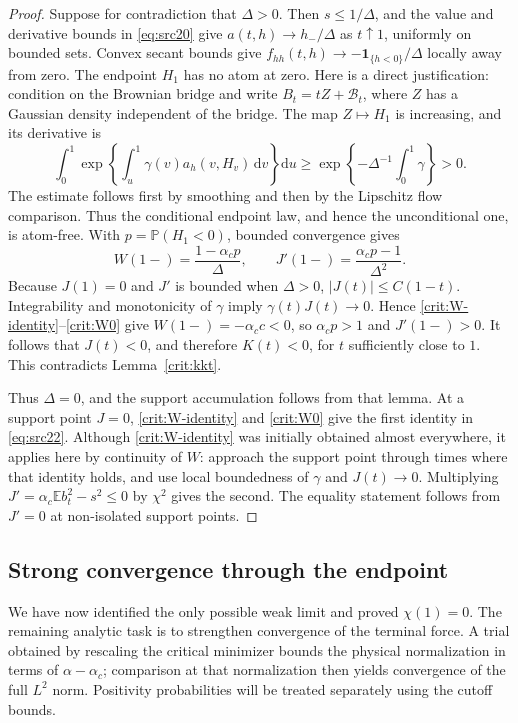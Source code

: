 \documentclass[11pt,a4paper]{article}
\numberwithin{equation}{section}
\theoremstyle{definition}
\theoremstyle{remark}
\newcommand{\E}{\mathbb E}
\newcommand{\Prob}{\mathbb P}
\newcommand{\dd}{\mathrm d}
\newcommand{\ind}{\mathbf 1}
\begin{document}
\begin{proof}
Suppose for contradiction that $\Delta>0$.  Then $s\le1/\Delta$,
and the value and derivative bounds in \eqref{eq:src20} give
$a(t,h)\to h_-/\Delta$ as $t\uparrow1$, uniformly on bounded sets.
Convex secant bounds give
$f_{hh}(t,h)\to-\ind_{\{h<0\}}/\Delta$ locally away from zero.
The endpoint $H_1$ has no atom at zero.  Here is a direct justification:
condition on the Brownian bridge and write $B_t=tZ+\mathcal B_t$, where
$Z$ has a Gaussian density independent of the bridge.  The map
$Z\mapsto H_1$ is increasing, and its derivative is
\[
 \int_0^1\exp\left\{\int_u^1\gamma(v)a_h(v,H_v)\,\dd v\right\}\dd u
      \ge\exp\left\{-\Delta^{-1}\int_0^1\gamma\right\}>0.
\]
The estimate follows first by smoothing and then by the Lipschitz
flow comparison.  Thus the conditional endpoint law, and hence the
unconditional one, is atom-free.  With $p=\Prob(H_1<0)$, bounded
convergence gives
\[
 W(1-)=\frac{1-\alpha_c p}{\Delta},\qquad
 J'(1-)=\frac{\alpha_c p-1}{\Delta^2}.
\]
Because $J(1)=0$ and $J'$ is bounded when $\Delta>0$,
$|J(t)|\le C(1-t)$.  Integrability and monotonicity of $\gamma$ imply
$\gamma(t)J(t)\to0$.  Hence \eqref{crit:W-identity}--\eqref{crit:W0}
give $W(1-)=-\alpha_c c<0$, so $\alpha_cp>1$ and $J'(1-)>0$.
It follows that $J(t)<0$, and therefore $K(t)<0$, for $t$ sufficiently
close to $1$.  This contradicts Lemma~\ref{crit:kkt}.

Thus $\Delta=0$, and the support accumulation follows from that lemma.
At a support point $J=0$, \eqref{crit:W-identity} and
\eqref{crit:W0} give the first identity in \eqref{eq:src22}.
Although \eqref{crit:W-identity} was initially obtained almost
everywhere, it applies here by continuity of $W$: approach the support
point through times where that identity holds, and use local
boundedness of $\gamma$ and $J(t)\to0$.
Multiplying $J'=\alpha_c\E b_t^2-s^2\le0$ by $\chi^2$ gives the
second.  The equality statement follows from $J'=0$ at non-isolated
support points.
\end{proof}

\subsection{Strong convergence through the endpoint}

We have now identified the only possible weak limit and proved
$\chi(1)=0$. The remaining analytic task is to strengthen convergence
of the terminal force. A trial obtained by rescaling the critical
minimizer bounds the physical normalization in terms of
$\alpha-\alpha_c$; comparison at that normalization then yields
convergence of the full $L^2$ norm. Positivity probabilities will be
treated separately using the cutoff bounds.
\end{document}
